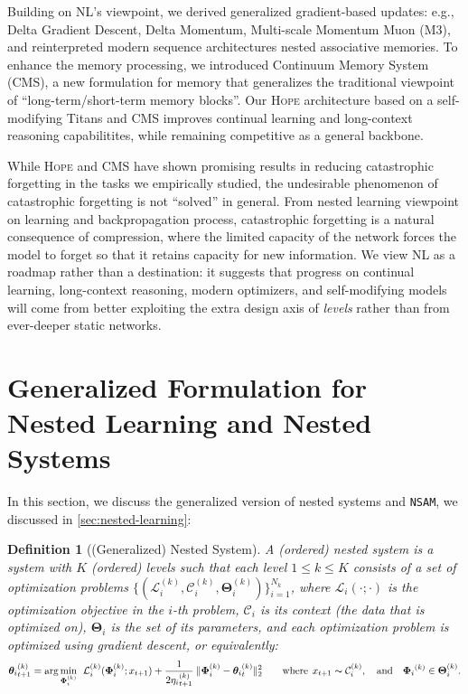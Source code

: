 \documentclass{article}
\newtheorem{dfn}{Definition}
\newcommand{\headdot}[1]{\vspace{1.7mm}\noindent{{\textcolor{c4}{\bf #1}}}}
\newcommand{\model}[0]{\textsc{Hope}}
\newcommand{\nsam}{\texttt{NSAM}}
\begin{document}
{Building on NL's viewpoint, we derived generalized gradient-based updates: e.g., Delta Gradient Descent, Delta Momentum, Multi-scale Momentum Muon (M3), and reinterpreted modern sequence architectures nested associative memories. To enhance the memory processing, we introduced Continuum Memory System (CMS), a new formulation for memory that generalizes the traditional viewpoint of ``long-term/short-term memory blocks''. Our \model{} architecture based on a self-modifying Titans and CMS improves continual learning and long-context reasoning capabilitites, while remaining competitive as a general backbone.

\headdot{Is Catastrophic Forgetting Solved?} 
While \model{} and CMS have shown promising results in reducing catastrophic forgetting in the tasks we empirically studied, the undesirable phenomenon of catastrophic forgetting is not ``solved''  in general. From nested learning viewpoint on learning and backpropagation process, catastrophic forgetting is a natural consequence of compression, where the limited capacity of the network forces the model to forget so that it retains capacity for new information. We view NL as a roadmap rather than a destination: it suggests that progress on continual learning, long-context reasoning, modern optimizers, and self-modifying models will come from better exploiting the extra design axis of \emph{levels} rather than from ever-deeper static networks. 

\newpage
\printbibliography
\newpage
\appendix

\section{Generalized Formulation for Nested Learning and Nested Systems}
In this section, we discuss the generalized version of nested systems and \nsam, we discussed in \autoref{sec:nested-learning}:

\begin{dfn}[(Generalized) Nested System]
    A (ordered) nested system is a system with $K$ (ordered) levels such that each level $1 \leq k \leq K$ consists of a set of optimization problems $\{ (\mathcal{L}^{(k)}_{i},  \mathcal{C}^{(k)}_i, \boldsymbol{\Theta}^{(k)}_{i}) \}_{i = 1}^{N_k}$, where $\mathcal{L}_{i}(\cdot; \cdot)$ is the optimization objective in the $i$-th problem, $\mathcal{C}_i$ is its context (the data that is optimized on), $\boldsymbol{\Theta}_{i}$ is the set of its parameters, and each optimization problem is optimized using gradient descent, or equivalently:
    \begin{align}
        {\boldsymbol{\theta}_{i}}^{(k)}_{t+1} = \arg\min_{\boldsymbol{\Phi}^{(k)}_{i}} \:\:  \mathcal{L}^{(k)}_i(\boldsymbol{\Phi}^{(k)}_{i}; x_{t+1}) + \frac{1}{2{\eta_{i}}^{(k)}_{t+1}}\:\|\boldsymbol{\Phi}^{(k)}_{i} - {\boldsymbol{\theta}_{i}}^{(k)}_{t} \|^{2}_2 \qquad \text{where}\:\: x_{t+1} \thicksim \mathcal{C}^{(k)}_i, \quad \text{and} \quad {\boldsymbol{\Phi}_{i}}^{(k)} \in  \boldsymbol{\Theta}^{(k)}_{i}.
    \end{align}
\end{dfn} 

}
\end{document}

